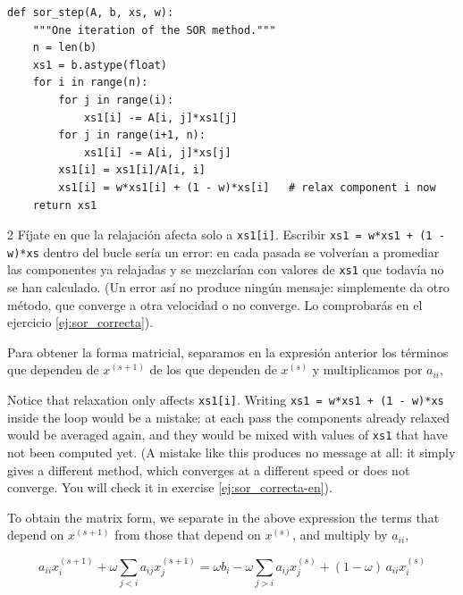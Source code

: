 \begin{verbatim}
def sor_step(A, b, xs, w):
    """One iteration of the SOR method."""
    n = len(b)
    xs1 = b.astype(float)
    for i in range(n):
        for j in range(i):
            xs1[i] -= A[i, j]*xs1[j]
        for j in range(i+1, n):
            xs1[i] -= A[i, j]*xs[j]
        xs1[i] = xs1[i]/A[i, i]
        xs1[i] = w*xs1[i] + (1 - w)*xs[i]   # relax component i now
    return xs1
\end{verbatim}

\begin{paracol}{2}
Fíjate en que la relajación afecta solo a \texttt{xs1[i]}. Escribir \texttt{xs1 = w*xs1 + (1 - w)*xs} dentro del bucle sería un error: en cada pasada se volverían a promediar las componentes ya relajadas y se mezclarían con valores de \texttt{xs1} que todavía no se han calculado. (Un error así no produce ningún mensaje: simplemente da otro método, que converge a otra velocidad o no converge. Lo comprobarás en el ejercicio \ref{ej:sor_correcta}).

Para obtener la forma matricial, separamos en la expresión anterior los términos que dependen de $x^{(s+1)}$ de los que dependen de $x^{(s)}$ y multiplicamos por $a_{ii}$,

\switchcolumn
Notice that relaxation only affects \texttt{xs1[i]}. Writing \texttt{xs1 = w*xs1 + (1 - w)*xs} inside the loop would be a mistake: at each pass the components already relaxed would be averaged again, and they would be mixed with values of \texttt{xs1} that have not been computed yet. (A mistake like this produces no message at all: it simply gives a different method, which converges at a different speed or does not converge. You will check it in exercise \ref{ej:sor_correcta-en}).

To obtain the matrix form, we separate in the above expression the terms that depend on $x^{(s+1)}$ from those that depend on $x^{(s)}$, and multiply by $a_{ii}$,
\end{paracol}
\begin{equation*}
	a_{ii}x_i^{(s+1)} + \omega \sum_{j< i}a_{ij}x_j^{(s+1)}= \omega b_i-\omega \sum_{j> i}a_{ij}x_j^{(s)}+(1-\omega)\, a_{ii} x_i^{(s)}
\end{equation*}

